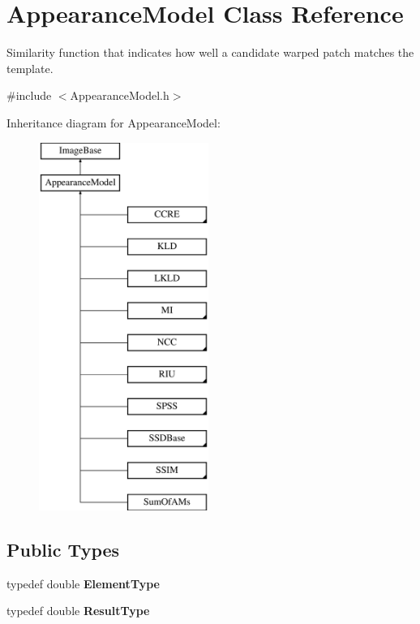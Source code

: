 \hypertarget{classAppearanceModel}{\section{Appearance\-Model Class Reference}
\label{classAppearanceModel}
}


Similarity function that indicates how well a candidate warped patch matches the template.  




{\ttfamily \#include $<$Appearance\-Model.\-h$>$}

Inheritance diagram for Appearance\-Model\-:\begin{figure}[H]
\begin{center}
\leavevmode
\includegraphics[height=12.000000cm]{classAppearanceModel}
\end{center}
\end{figure}
\subsection*{Public Types}
\begin{DoxyCompactItemize}
\item 
\hypertarget{classAppearanceModel_a6e19328a81eb4c05ce1ad2e2887e17a3}{typedef double {\bfseries Element\-Type}}\label{classAppearanceModel_a6e19328a81eb4c05ce1ad2e2887e17a3}

\item 
\hypertarget{classAppearanceModel_af0cc383d55025c98be4de620d448cb20}{typedef double {\bfseries Result\-Type}}\label{classAppearanceModel_af0cc383d55025c98be4de620d448cb20}

\end{DoxyCompactItemize}
